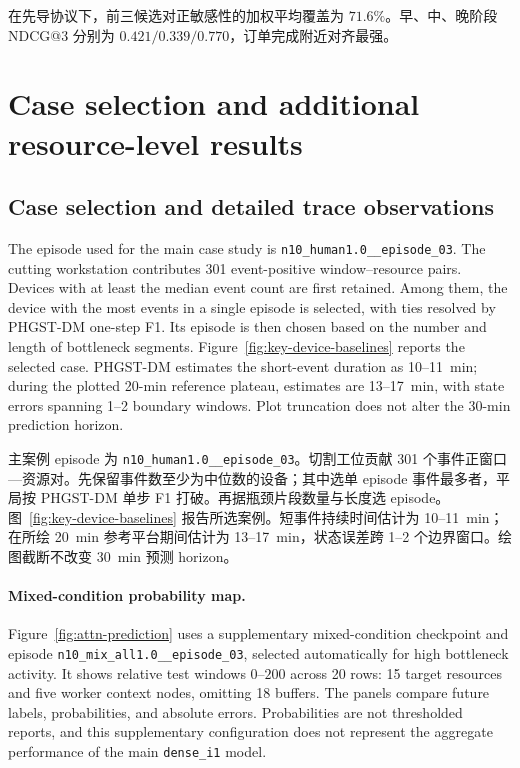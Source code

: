 \documentclass[a4paper,fleqn]{cas-dc}
\newcommand{\zhpara}[1]{%
  \par\begingroup\small\color{black!72}\noindent #1\par\endgroup}
\begin{document}
\zhpara{在先导协议下，前三候选对正敏感性的加权平均覆盖为 $71.6\%$。早、中、晚阶段 NDCG@3 分别为 $0.421/0.339/0.770$，订单完成附近对齐最强。}


\section{Case selection and additional resource-level results}\label{app:case-details}

\subsection{Case selection and detailed trace observations}

The episode used for the main case study is \texttt{n10\_human1.0\_\_episode\_03}. The cutting workstation contributes 301 event-positive window--resource pairs. Devices with at least the median event count are first retained. Among them, the device with the most events in a single episode is selected, with ties resolved by PHGST-DM one-step F1. Its episode is then chosen based on the number and length of bottleneck segments. Figure~\ref{fig:key-device-baselines} reports the selected case. PHGST-DM estimates the short-event duration as 10--11~min; during the plotted 20-min reference plateau, estimates are 13--17~min, with state errors spanning 1--2 boundary windows. Plot truncation does not alter the 30-min prediction horizon.

\zhpara{主案例 episode 为 \texttt{n10\_human1.0\_\_episode\_03}。切割工位贡献 301 个事件正窗口—资源对。先保留事件数至少为中位数的设备；其中选单 episode 事件最多者，平局按 PHGST-DM 单步 F1 打破。再据瓶颈片段数量与长度选 episode。图~\ref{fig:key-device-baselines} 报告所选案例。短事件持续时间估计为 10--11~min；在所绘 20~min 参考平台期间估计为 13--17~min，状态误差跨 1--2 个边界窗口。绘图截断不改变 30~min 预测 horizon。}












\paragraph*{Mixed-condition probability map.}
Figure~\ref{fig:attn-prediction} uses a supplementary mixed-condition checkpoint and episode \texttt{n10\_mix\_all1.0\_\_episode\_03}, selected automatically for high bottleneck activity. It shows relative test windows $0$--$200$ across 20 rows: 15 target resources and five worker context nodes, omitting 18 buffers. The panels compare future labels, probabilities, and absolute errors. Probabilities are not thresholded reports, and this supplementary configuration does not represent the aggregate performance of the main \texttt{dense\_i1} model.
\end{document}
